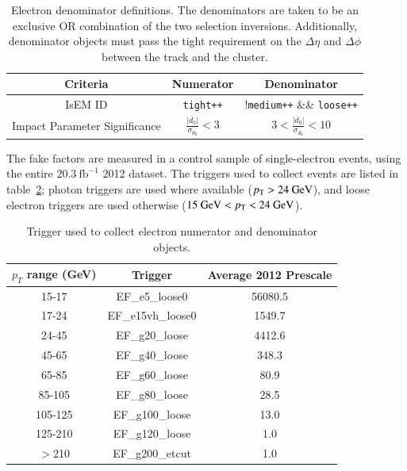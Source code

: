 \begin{table}[h]
  \centering
  \begin{tabular}{ccc}
	\hline
	Criteria & Numerator & Denominator \\ \hline
	IsEM ID & \verb.tight++. & !\verb.medium++. \&\& \verb.loose++.  \\
	Impact Parameter Significance & $\frac{|d_0|}{\sigma_{d_0}} < 3$ & $3 < \frac{|d_0|}{\sigma_{d_0}} < 10$ \\
	\hline
  \end{tabular}
  \caption{Electron denominator definitions. The denominators are taken to be an exclusive OR combination of the two selection inversions. Additionally, denominator objects must pass the tight requirement on the $\Delta\eta$ and $\Delta\phi$ between the track and the cluster.}
  \label{table:electron-denominator-definition}
\end{table}

The fake factors are measured in a control sample of single-electron events, using the entire $20.3~\mbox{fb}^{-1}$ 2012 dataset. The triggers used to collect events are listed in table~\ref{table:electron-fake-factor-triggers}; photon triggers are used where available ($p_{\text{T}}>24~\mbox{GeV}$), and loose electron triggers are used otherwise ($15~\mbox{GeV}<p_{\text{T}}<24~\mbox{GeV}$). 

\begin{table}[h]
  \centering
  \begin{tabular}{ccc}
  \hline
	$p_T$ range (GeV) & Trigger & Average 2012 Prescale \\
	\hline
	15-17 & EF\_e5\_loose0 & 56080.5\\
	17-24 & EF\_e15vh\_loose0 & 1549.7\\
	24-45 & EF\_g20\_loose & 4412.6\\
	45-65 & EF\_g40\_loose & 348.3\\
	65-85 & EF\_g60\_loose & 80.9\\
	85-105 & EF\_g80\_loose & 28.5\\
	105-125 & EF\_g100\_loose & 13.0\\
	125-210 & EF\_g120\_loose & 1.0\\
	$>$210 & EF\_g200\_etcut & 1.0\\ \hline
  \end{tabular}
  \caption{Trigger used to collect electron numerator and denominator objects.}
  \label{table:electron-fake-factor-triggers}
\end{table}

